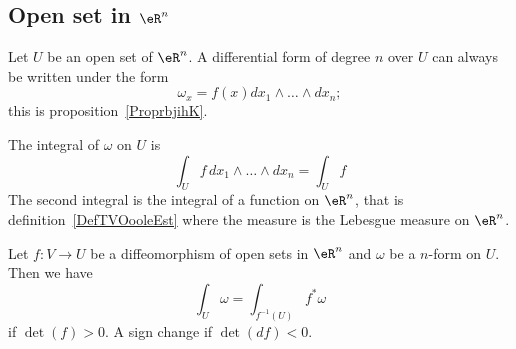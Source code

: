 \subsection{Open set in \( \eR^n\)}

Let \( U\) be an open set of \( \eR^n\). A differential form of degree \( n\) over \( U\) can always be written under the form
\begin{equation}
	\omega_x=f(x)dx_1\wedge\ldots\wedge dx_n;
\end{equation}
this is proposition~\ref{ProprbjihK}.

\begin{definition}      \label{DEFooEYRFooRQTmRF}
	The integral of \( \omega\) on \( U\) is
	\begin{equation}
		\int_{U}f\,dx_1\wedge\ldots\wedge dx_n=\int_Uf
	\end{equation}
	The second integral is the integral of a function on \( \eR^n\), that is definition~\ref{DefTVOooleEst} where the measure is the Lebesgue measure on \( \eR^n\).
\end{definition}

\begin{lemma}       \label{LEMooNCYSooXtnCKq}
	Let \( f\colon V\to U\) be a diffeomorphism of open sets in \( \eR^n\) and \( \omega\) be a \( n\)-form on \( U\). Then we have
	\begin{equation}
		\int_U\omega=\int_{f^{-1}(U)}f^*\omega
	\end{equation}
	if \( \det(f)>0\). A sign change if \( \det(df)<0\).
\end{lemma}

